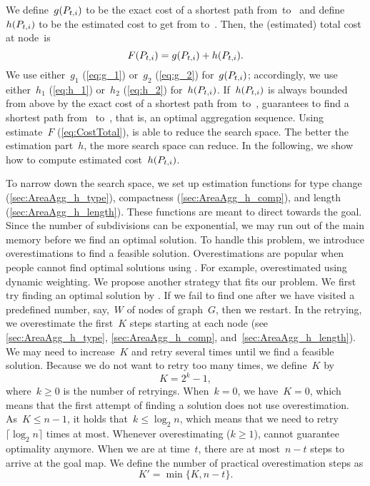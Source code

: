 We define~$g(P_{t,i})$ to be 
the exact cost of a shortest path from~\Pstart to~\Pnode 
and define~$h(P_{t,i})$ to be the estimated cost 
to get from \Pnode to~\Pgoal. 
Then, the (estimated) total cost at node~\Pnode is
\begin{equation}
\label{eq:CostTotal}
F(P_{t,i})=g(P_{t,i})+h(P_{t,i}).
\end{equation}
We use either~$g_1$ (\eq\ref{eq:g_1}) 
or~$g_2$ (\eq\ref{eq:g_2}) for~$g(P_{t,i})$;
accordingly, we use either~$h_1$ (\eq\ref{eq:h_1}) 
or~$h_2$ (\eq\ref{eq:h_2}) for~$h(P_{t,i})$.
If~$h(P_{t,i})$ is always bounded from above 
by the exact cost of a shortest path from~\Pnode to~\Pgoal, 
\Astar guarantees to find a shortest path from~\Pstart 
to~\Pgoal, 
that is, an optimal aggregation sequence.  
Using estimate~$F$ (\eq\ref{eq:CostTotal}), 
\Astar is able to reduce the search space.
The better the estimation part~$h$, 
the more search space \Astar can reduce.
In the following, we show how to compute
estimated cost~$h(P_{t,i})$.

To narrow down the search space, 
we set up estimation functions 
for type change (\sect\ref{sec:AreaAgg_h_type}), 
compactness (\sect\ref{sec:AreaAgg_h_comp}), 
and length (\sect\ref{sec:AreaAgg_h_length}). 
These functions are meant to direct \Astar towards the goal.
Since the number of subdivisions can be exponential, 
we may run out of the main memory 
before we find an optimal solution. 
To handle this problem, we introduce overestimations 
to find a feasible solution. 
Overestimations are popular 
when people cannot find optimal solutions using \Astar. 
For example, \textcite{Pohl1973} overestimated 
using dynamic weighting. 
We propose another strategy that fits our problem. 
We first try finding an optimal solution by \Astar. 
If we fail to find one after 
we have visited a predefined number, 
say,~$W$ of nodes of graph~$G$,
then we restart.
In the retrying, we overestimate the first~$K$ steps 
starting at each node
(see \sects\ref{sec:AreaAgg_h_type}, \ref{sec:AreaAgg_h_comp},
and~\ref{sec:AreaAgg_h_length}).
We may need to increase~$K$ and retry several times 
until we find a feasible solution.
Because we do not want to retry too many times,
we define~$K$ by
\begin{equation}
\label{eq:OverestimateK}
K= 2^k -1,
\end{equation}
where~$k\ge 0$ is the number of retryings.
When~$k = 0$, we have~$K=0$,
which means that the first attempt of finding a solution
does not use overestimation.
As~$K\le n-1$, it holds that~$k \le \log_2 n$, 
which means that we need to 
retry~$\lceil \log_2 n\rceil$ times at most.
Whenever overestimating ($k\geq1$), 
\Astar cannot guarantee optimality anymore.
When we are at time~$t$, there are at most~$n-t$ steps 
to arrive at the goal map.
We define the number of practical overestimation steps as
\begin{equation}
\label{eq:OverestimateKPrime}
K'= \min \{K, n-t\}.
\end{equation}



